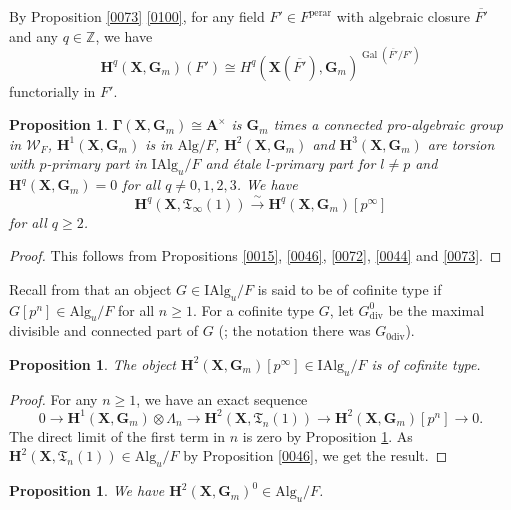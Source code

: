 \documentclass{amsart}
\newtheorem{Prop}[Thm]{Proposition}
\theoremstyle{remark}
\numberwithin{equation}{section}
\newcommand{\isomto}{\overset{\sim}{\to}}
\newcommand{\tensor}{\mathbin{\otimes}}
\newcommand{\closure}[1]{\overline{#1}}
\newcommand{\Z}{\mathbb{Z}}
\newcommand{\Gm}{\mathbf{G}_{m}}
\newcommand{\divis}{\mathrm{div}}
\newcommand{\perar}{\mathrm{perar}}
\newcommand{\Alg}{\mathrm{Alg}}
\newcommand{\Ind}{\mathrm{I}}
\newcommand{\alg}[1]{\mathbf{#1}}
\DeclareMathOperator{\Gal}{Gal}
\begin{document}
By Proposition \ref{0073} \eqref{0100},
for any field $F' \in F^{\perar}$ with algebraic closure $\closure{F'}$ and any $q \in \Z$,
we have
	\[
			\alg{H}^{q}(\alg{X}, \Gm)(F')
		\cong
			H^{q}(\alg{X}(\closure{F'}), \Gm)^{\Gal(\closure{F'} / F')}
	\]
functorially in $F'$.

\begin{Prop} \label{0076}
	$\alg{\Gamma}(\alg{X}, \Gm) \cong \alg{A}^{\times}$ is
	$\Gm$ times a connected pro-algebraic group in $\mathcal{W}_{F}$,
	$\alg{H}^{1}(\alg{X}, \Gm)$ is in $\Alg / F$,
	$\alg{H}^{2}(\alg{X}, \Gm)$ and $\alg{H}^{3}(\alg{X}, \Gm)$ are torsion
	with $p$-primary part in $\Ind \Alg_{u} / F$
	and \'etale $l$-primary part for $l \ne p$
	and $\alg{H}^{q}(\alg{X}, \Gm) = 0$ for all $q \ne 0, 1, 2, 3$.
	We have
		\[
				\alg{H}^{q}(\alg{X}, \mathfrak{T}_{\infty}(1))
			\isomto
				\alg{H}^{q}(\alg{X}, \Gm)[p^{\infty}]
		\]
	for all $q \ge 2$.
\end{Prop}

\begin{proof}
	This follows from Propositions \ref{0015}, \ref{0046}, \ref{0072}, \ref{0044} and \ref{0073}.
\end{proof}

Recall from \cite[Section 2.1]{SuzCurve} that
an object $G \in \Ind \Alg_{u} / F$ is said to be of cofinite type
if $G[p^{n}] \in \Alg_{u} / F$ for all $n \ge 1$.
For a cofinite type $G$,
let $G_{\divis}^{0}$ be the maximal divisible and connected part of $G$
(\cite[Proposition 2.2.2]{SuzCurve}; the notation there was $G_{0 \divis}$).

\begin{Prop}
	The object $\alg{H}^{2}(\alg{X}, \Gm)[p^{\infty}] \in \Ind \Alg_{u} / F$ is of cofinite type.
\end{Prop}

\begin{proof}
	For any $n \ge 1$, we have an exact sequence
		\[
				0
			\to
				\alg{H}^{1}(\alg{X}, \Gm) \tensor \Lambda_{n}
			\to
				\alg{H}^{2}(\alg{X}, \mathfrak{T}_{n}(1))
			\to
				\alg{H}^{2}(\alg{X}, \Gm)[p^{n}]
			\to
				0.
		\]
	The direct limit of the first term in $n$ is zero
	by Proposition \ref{0076}.
	As $\alg{H}^{2}(\alg{X}, \mathfrak{T}_{n}(1)) \in \Alg_{u} / F$ by Proposition \ref{0046},
	we get the result.
\end{proof}

\begin{Prop} \label{0068}
	We have $\alg{H}^{2}(\alg{X}, \Gm)^{0} \in \Alg_{u} / F$.
\end{Prop}
\end{document}
